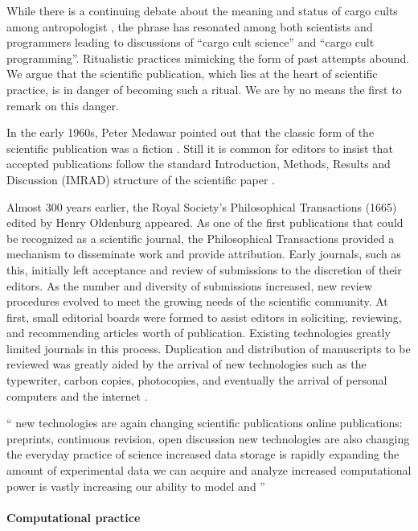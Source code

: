 \documentclass[ChapterTOCs,krantz2]{krantz} %
\begin{document}
While there is a continuing debate about the meaning and status of cargo cults
among antropologist \cite{jebens2004cargo}, the phrase has resonated among both
scientists and programmers leading to discussions of ``cargo cult science'' and
``cargo cult programming''. Ritualistic practices mimicking the form of past
attempts abound. We argue that the scientific publication, which lies at the
heart of scientific practice, is in danger of becoming such a ritual. We are
by no means the first to remark on this danger.

In the early 1960s, Peter Medawar pointed out that the classic form of the
scientific publication was a fiction \cite{medawar1963scientific}. Still
it is common for editors to insist that accepted publications follow the
standard Introduction, Methods, Results and Discussion (IMRAD) structure of the
scientific paper \cite{sollaci2004introduction}.

Almost 300 years earlier, the Royal Society's Philosophical Transactions (1665)
edited by Henry Oldenburg appeared. As one of the first publications that could be
recognized as a scientific journal, the Philosophical Transactions provided a
mechanism to disseminate work and provide attribution. Early journals, such as this,
initially left acceptance and review of submissions to the discretion of their
editors. As the number and diversity of submissions increased, new review procedures
evolved to meet the growing needs of the scientific community. At first, small
editorial boards were formed to assist editors in soliciting, reviewing,
and recommending articles worth of publication. Existing technologies greatly
limited journals in this process. Duplication and distribution of manuscripts
to be reviewed was greatly aided by the arrival of new technologies such as
the typewriter, carbon copies, photocopies, and eventually the arrival of
personal computers and the internet \cite{spier2002history}.

``
    new technologies are again changing scientific publications
        online publications: preprints, continuous revision, open discussion
    new technologies are also changing the everyday practice of science
        increased data storage is rapidly expanding the amount of experimental data we can acquire and analyze
        increased computational power is vastly increasing our ability to model and
''



\paragraph{ {\bf Computational practice}}
\end{document}
